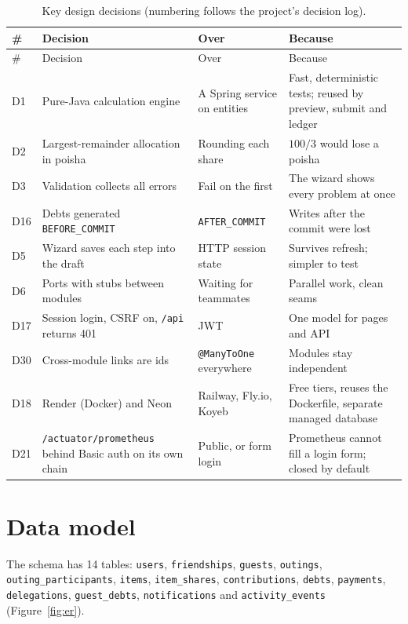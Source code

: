 \documentclass[10pt,a4paper]{article}
\newcommand{\code}[1]{\texttt{#1}}
\begin{document}
{\small
\begin{longtable}{@{}p{0.9cm}>{\raggedright\arraybackslash}p{4.4cm}>{\raggedright\arraybackslash}p{3.4cm}>{\raggedright\arraybackslash}p{6.4cm}@{}}
\caption{Key design decisions (numbering follows the project's decision log).}\\
\toprule
\# & Decision & Over & Because \\
\midrule
\endfirsthead
\toprule
\# & Decision & Over & Because \\
\midrule
\endhead
\bottomrule
\endfoot
D1 & Pure-Java calculation engine & A Spring service on entities & Fast, deterministic tests; reused by preview, submit and ledger \\
D2 & Largest-remainder allocation in poisha & Rounding each share & $100/3$ would lose a poisha \\
D3 & Validation collects all errors & Fail on the first & The wizard shows every problem at once \\
D16 & Debts generated \code{BEFORE\_COMMIT} & \code{AFTER\_COMMIT} & Writes after the commit were lost \\
D5 & Wizard saves each step into the draft & HTTP session state & Survives refresh; simpler to test \\
D6 & Ports with stubs between modules & Waiting for teammates & Parallel work, clean seams \\
D17 & Session login, CSRF on, \code{/api} returns 401 & JWT & One model for pages and API \\
D30 & Cross-module links are ids & \code{@ManyToOne} everywhere & Modules stay independent \\
D18 & Render (Docker) and Neon & Railway, Fly.io, Koyeb & Free tiers, reuses the Dockerfile, separate managed database \\
D21 & \code{/actuator/prometheus} behind Basic auth on its own chain & Public, or form login & Prometheus cannot fill a login form; closed by default \\
\end{longtable}}

\clearpage
\section{Data model}

The schema has 14 tables: \code{users}, \code{friendships}, \code{guests}, \code{outings}, \code{outing\_participants},
\code{items}, \code{item\_shares}, \code{contributions}, \code{debts}, \code{payments}, \code{delegations},
\code{guest\_debts}, \code{notifications} and \code{activity\_events} (Figure~\ref{fig:er}).
\end{document}
